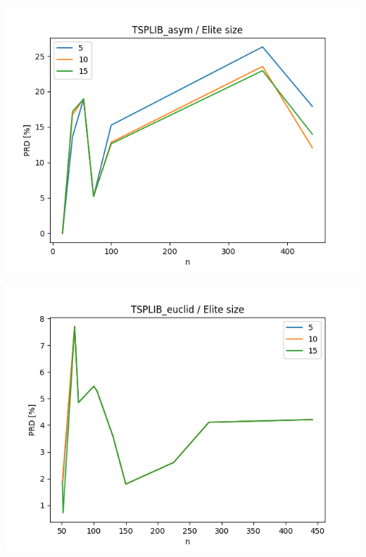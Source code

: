 \documentclass{article}
\begin{document}
\begin{center}
\includegraphics[width=\textwidth, 
                   height = 0.4\textheight, 
                   keepaspectratio]
                  {plots/tsplib_asym_4_elite_num} 
\end{center}

\begin{center}
\includegraphics[width=\textwidth, 
                   height = 0.4\textheight, 
                   keepaspectratio]
                  {plots/tsplib_euclid_4_elite_num} 
\end{center}
\end{document}
